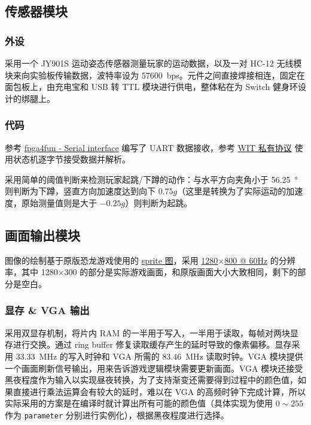 \documentclass[UTF8, 11pt, fontset=none]{ctexart}
\begin{document}
\subsection{传感器模块}

\subsubsection{外设}

采用一个 JY901S 运动姿态传感器测量玩家的运动数据，以及一对 HC-12 无线模块来向实验板传输数据，波特率设为 \SI{57600}{bps}。元件之间直接焊接相连，固定在面包板上，由充电宝和 USB 转 TTL 模块进行供电，整体粘在为 Switch 健身环设计的绑腿上。

\subsubsection{代码}

参考 \href{https://www.fpga4fun.com/SerialInterface.html}{fpga4fun - Serial interface} 编写了 UART 数据接收，参考 \href{https://wit-motion.yuque.com/wumwnr/ltst03/vl3tpy}{WIT 私有协议} 使用状态机逐字节接受数据并解析。

采用简单的阈值判断来检测玩家起跳/下蹲的动作：与水平方向夹角小于 \SI{56.25}{\degree} 则判断为下蹲，竖直方向加速度达到向下 $0.75g$（这里是转换为了实际运动的加速度，原始测量值则是大于 $-0.25g$）则判断为起跳。

\subsection{画面输出模块}

图像的绘制基于原版恐龙游戏使用的 \href{https://github.com/chromium/chromium/blob/3b31f1cbd28e0a1199defe6f6b37001cef4c4790/components/neterror/resources/images/default_200_percent/offline/200-offline-sprite.png}{sprite 图}，采用 \href{http://tinyvga.com/vga-timing/1280x800@60Hz}{1280$\times$800 @ 60Hz} 的分辨率，其中 1280$\times$300 的部分是实际游戏画面，和原版画面大小大致相同，剩下的部分是空白。

\subsubsection{显存 \& VGA 输出}

采用双显存机制，将片内 RAM 的一半用于写入，一半用于读取，每帧对两块显存进行交换。通过 ring buffer 修复读取缓存产生的延时导致的像素偏移。显存采用 \SI{33.33}{\mega\hertz} 的写入时钟和 VGA 所需的 \SI{83.46}{\mega\hertz} 读取时钟。VGA 模块提供一个画面刷新信号输出，用来告诉游戏逻辑模块需要更新画面。VGA 模块还接受黑夜程度作为输入以实现昼夜转换，为了支持渐变还需要得到过程中的颜色值，如果直接进行乘法运算会有较大的延时，难以在 VGA 的高频时钟下完成计算，所以实际采用的方案是在编译时就计算出所有可能的颜色值（具体实现为使用 $0 \sim 255$ 作为 \texttt{parameter} 分别进行实例化），根据黑夜程度进行选择。
\end{document}
